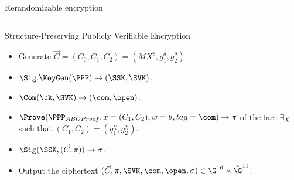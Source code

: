 \begin{frame}{Rerandomizable encryption}



  \begin{columns}
    \begin{column}{0.5\textwidth}
      \tiny
      Structure-Preserving Publicly Verifiable Encryption 
      \begin{itemize}
      \item Generate $\vec{C} = (C_0, C_1, C_2) = (MX^{\theta}, g_1^{\theta},  g_2^{\theta})$.
      \item $\Sig.\KeyGen(\PPP) \to (\SSK, \SVK)$.
      \item $\Com(\ck, \SVK) \to (\com, \open)$.
      \item $\Prove(\PPP_{ABOProof}, x = (C_1, C_2), w = \theta, tag = \com) \to \pi$ of the fact $\exists \chi$ such that $(C_1, C_2) = (g_1^\chi, g_2^\chi)$.
      \item $\Sig(\SSK,(\vec{C},\pi)) \to \sigma$.
      \item Output the ciphertext $(\vec{C}, \pi, \SVK, \com, \open, \sigma) \in \G^{16} \times \hat{\G}^{11}$.
      \end{itemize}


\end{column}
\end{columns}
\end{frame}
